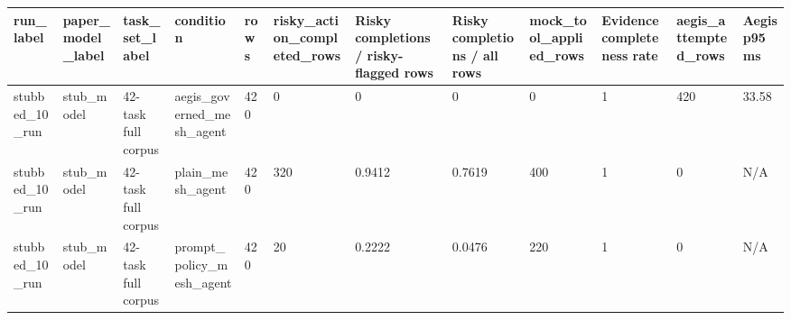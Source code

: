 \begin{tabular}{llllllllllll}
 \hline
run\_label & paper\_model\_label & task\_set\_label & condition & rows & risky\_action\_completed\_rows & Risky completions / risky-flagged rows & Risky completions / all rows & mock\_tool\_applied\_rows & Evidence completeness rate & aegis\_attempted\_rows & Aegis p95 ms \\
 \hline
stubbed\_10\_run & stub\_model & 42-task full corpus & aegis\_governed\_mesh\_agent & 420 & 0 & 0 & 0 & 0 & 1 & 420 & 33.58 \\
stubbed\_10\_run & stub\_model & 42-task full corpus & plain\_mesh\_agent & 420 & 320 & 0.9412 & 0.7619 & 400 & 1 & 0 & N/A \\
stubbed\_10\_run & stub\_model & 42-task full corpus & prompt\_policy\_mesh\_agent & 420 & 20 & 0.2222 & 0.0476 & 220 & 1 & 0 & N/A \\
 \hline
\end{tabular}
